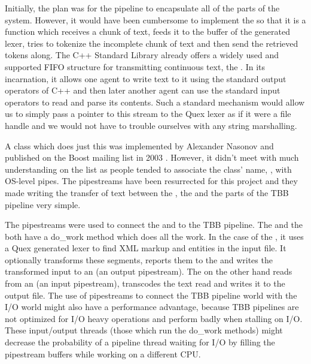 Initially, the plan was for the pipeline to encapsulate all of the parts of the
system. However, it would have been cumbersome to implement the
 so that it is a function which receives a chunk of text,
feeds it to the buffer of the generated lexer, tries to tokenize the incomplete
chunk of text and then send the retrieved tokens along. The C++ Standard
Library already offers a widely used and supported FIFO structure for
transmitting continuous text, the . In its
 incarnation, it allows one agent to write text to it using
the standard output operators of C++ and then later another agent can use the
standard input operators to read and parse its contents. Such a standard
mechanism would allow us to simply pass a pointer to this stream to the Quex
lexer as if it were a file handle and we would not have to trouble ourselves
with any string marshalling.

A class which does just this was implemented by Alexander Nasonov and published
on the Boost mailing list in 2003 \cite{web-pipes}. However, it didn't meet
with much understanding on the list as people tended to associate the class'
name, , with OS-level pipes. The pipestreams have been resurrected
for this project and they made writing the transfer of text between the
, the  and the parts of the TBB pipeline
very simple.

The pipestreams were used to connect the  and
 to the TBB pipeline. The  and the
 both have a do\_\-work method which does all the work. In the
case of the , it uses a Quex generated lexer to find XML
markup and entities in the input file. It optionally transforms these
segments, reports them to the  and writes the
transformed input to an  (an output pipestream). The
 on the other hand reads from an  (an input
pipestream), transcodes the text read and writes it to the output file. The
use of pipestreams to connect the TBB pipeline world with the I/O world might
also have a performance advantage, because TBB pipelines are not optimized for
I/O heavy operations and perform badly when stalling on I/O. These
input/output threads (those which run the do\_\-work methods) might decrease
the probability of a pipeline thread waiting for I/O by filling the pipestream
buffers while working on a different CPU.
